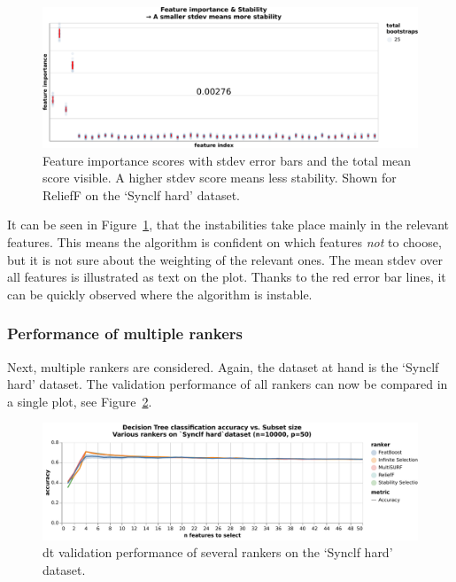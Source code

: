 \documentclass[../main.tex]{subfiles}
\begin{document}
\begin{figure}[ht]
    \centering
    \includegraphics[width=0.9\linewidth]{report/images/results-importances-stability-relieff-example.pdf}
    \caption{Feature importance scores with stdev error bars and the total mean score visible. A higher stdev score means less stability. Shown for ReliefF on the `Synclf hard' dataset.}
    \label{fig:results-importances-stability-relieff-example}
\end{figure}

It can be seen in Figure~\ref{fig:results-importances-stability-relieff-example}, that the instabilities take place mainly in the relevant features. This means the algorithm is confident on which features \textit{not} to choose, but it is not sure about the weighting of the relevant ones. The mean stdev over all features is illustrated as text on the plot. Thanks to the red error bar lines, it can be quickly observed where the algorithm is instable. 

\subsubsection{Performance of multiple rankers}

Next, multiple rankers are considered. Again, the dataset at hand is the `Synclf hard' dataset. The validation performance of all rankers can now be compared in a single plot, see Figure~\ref{fig:results-validation-dt-various-rankers}.

\begin{figure}[ht]
    \centering
    \includegraphics[width=\linewidth]{report/images/results-validation-dt-various-rankers.pdf}
    \caption{\gls{dt} validation performance of several rankers on the `Synclf hard' dataset.}
    \label{fig:results-validation-dt-various-rankers}
\end{figure}
\end{document}
